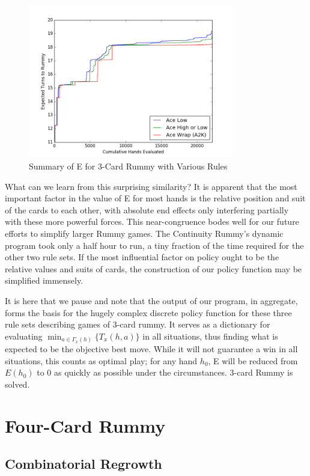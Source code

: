 \documentclass[letter,12pt]{article}
\begin{document}
\begin{figure}
\centering
\includegraphics[width=0.8\textwidth]{fig2.png}
\caption{Summary of E for 3-Card Rummy with Various Rules}\label{fig:2}
\end{figure}

What can we learn from this surprising similarity? It is apparent that the most important factor in the value of E for most hands is the relative position and suit of the cards to each other, with absolute end effects only interfering partially with these more powerful forces.  This near-congruence bodes well for our future efforts to simplify larger Rummy games. The Continuity Rummy’s dynamic program took only a half hour to run, a tiny fraction of the time required for the other two rule sets. If the most influential factor on policy ought to be the relative values and suits of cards, the construction of our policy function may be simplified immensely.

It is here that we pause and note that the output of our program, in aggregate, forms the basis for the hugely complex discrete policy function for these three rule sets describing games of 3-card rummy. It serves as a dictionary for evaluating $\min_{a\in \Gamma_x(h)}\{T_x(h,a)\}$ in all situations, thus finding what is expected to be the objective best move. While it will not guarantee a win in all situations, this counts as optimal play; for any hand $h_0$, E will be reduced from $E(h_0)$ to 0 as quickly as possible under the circumstances. 3-card Rummy is solved. 

\section{Four-Card Rummy}

\subsection{Combinatorial Regrowth}
\end{document}
